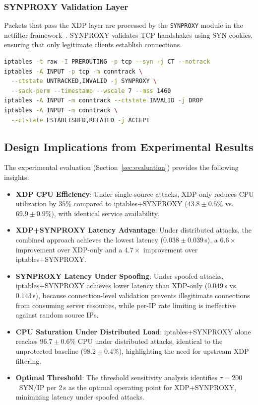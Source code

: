 \documentclass[conference]{IEEEtran}
\begin{document}
\subsubsection{SYNPROXY Validation Layer}

Packets that pass the XDP layer are processed by the \texttt{SYNPROXY}
module in the netfilter framework~\cite{iptables_synproxy}.
SYNPROXY validates TCP handshakes using SYN cookies, ensuring that only
legitimate clients establish connections.

\begin{lstlisting}[language=bash]
iptables -t raw -I PREROUTING -p tcp --syn -j CT --notrack
iptables -A INPUT -p tcp -m conntrack \
  --ctstate UNTRACKED,INVALID -j SYNPROXY \
  --sack-perm --timestamp --wscale 7 --mss 1460
iptables -A INPUT -m conntrack --ctstate INVALID -j DROP
iptables -A INPUT -m conntrack \
  --ctstate ESTABLISHED,RELATED -j ACCEPT
\end{lstlisting}

\subsection{Design Implications from Experimental Results}

The experimental evaluation (Section~\ref{sec:evaluation}) provides the
following insights:

\begin{itemize}
  \item \textbf{XDP CPU Efficiency}: Under single-source attacks, XDP-only
        reduces CPU utilization by $35$\% compared to iptables+SYNPROXY
        ($43.8 \pm 0.5$\% vs.\ $69.9 \pm 0.9$\%), with identical
        service availability.
  \item \textbf{XDP+SYNPROXY Latency Advantage}: Under distributed attacks,
        the combined approach achieves the lowest latency
        ($0.038 \pm 0.039$\,s), a $6.6\times$ improvement over XDP-only
        and a $4.7\times$ improvement over iptables+SYNPROXY.
  \item \textbf{SYNPROXY Latency Under Spoofing}: Under spoofed attacks,
        iptables+SYNPROXY achieves lower latency than XDP-only
        ($0.049$\,s vs.\ $0.143$\,s), because connection-level validation
        prevents illegitimate connections from consuming server resources,
        while per-IP rate limiting is ineffective against random source IPs.
  \item \textbf{CPU Saturation Under Distributed Load}:
        iptables+SYNPROXY alone reaches $96.7 \pm 0.6$\% CPU under
        distributed attacks, identical to the unprotected baseline
        ($98.2 \pm 0.4$\%), highlighting the need for upstream XDP
        filtering.
  \item \textbf{Optimal Threshold}: The threshold sensitivity analysis
        identifies $\tau=200$~SYN/IP per 2\,s as the optimal operating
        point for XDP+SYNPROXY, minimizing latency under spoofed attacks.
\end{itemize}
\end{document}
